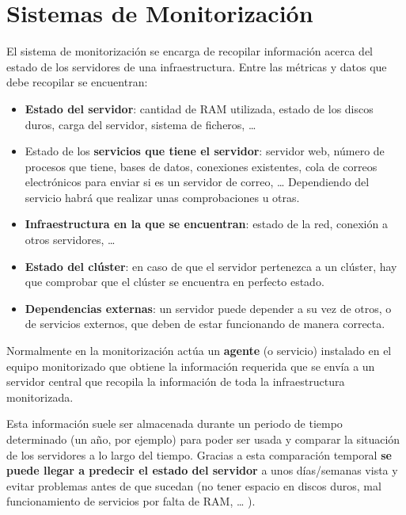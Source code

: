 \chapter{Sistemas de Monitorización}

El sistema de monitorización se encarga de recopilar información acerca del estado de los servidores de una infraestructura. Entre las métricas y datos que debe recopilar se encuentran:

\begin{itemize}
    \item \textbf{Estado del servidor}: cantidad de RAM utilizada, estado de los discos duros, carga del servidor, sistema de ficheros,  …
    \item Estado de los \textbf{servicios que tiene el servidor}: servidor web, número de procesos que tiene, bases de datos, conexiones existentes, cola de correos electrónicos para enviar si es un servidor de correo, … Dependiendo del servicio habrá que realizar unas comprobaciones u otras.
    \item \textbf{Infraestructura en la que se encuentran}: estado de la red, conexión a otros servidores, …
    \item \textbf{Estado del clúster}: en caso de que el servidor pertenezca a un clúster, hay que comprobar que el clúster se encuentra en perfecto estado.
    \item \textbf{Dependencias externas}: un servidor puede depender a su vez de otros, o de servicios externos, que deben de estar funcionando de manera correcta.
\end{itemize}

Normalmente en la monitorización actúa un \textbf{agente} (o servicio) instalado en el equipo monitorizado que obtiene la información requerida que se envía a un servidor central que recopila la información de toda la infraestructura monitorizada.

Esta información suele ser almacenada durante un periodo de tiempo determinado (un año, por ejemplo) para poder ser usada y comparar la situación de los servidores a lo largo del tiempo. Gracias a esta comparación temporal \textbf{se puede llegar a predecir el estado del servidor} a unos días/semanas vista y evitar problemas antes de que sucedan (no tener espacio en discos duros, mal funcionamiento de servicios por falta de RAM, … ).


